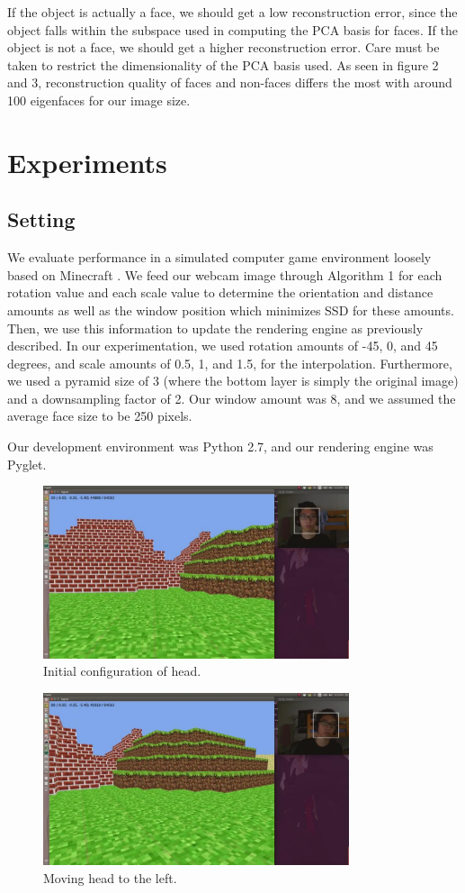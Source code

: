 \documentclass[10pt,twocolumn,letterpaper]{article}
\begin{document}
If the object is actually a face, we should get a low reconstruction error, since the object falls within the subspace used in computing the PCA basis for faces. If the object is not a face, we should get a higher reconstruction error. Care must be taken to restrict the dimensionality of the PCA basis used. As seen in figure 2 and 3, reconstruction quality of faces and non-faces differs the most with around 100 eigenfaces for our image size.

\section*{Experiments}

\subsection*{Setting}
We evaluate performance in a simulated computer game environment loosely based
on Minecraft \cite{minecraft}. We feed our webcam image through Algorithm 1 for each rotation
value and each scale value to determine the orientation and distance amounts as well as
the window position which minimizes SSD for these amounts. Then, we use this
information to update the rendering engine as previously described. In our experimentation,
we used rotation amounts of -45, 0, and 45 degrees, and scale amounts of 0.5, 1, and 1.5,
for the interpolation. Furthermore, we used a pyramid size of 3 (where the bottom
layer is simply the original image) and a downsampling factor of 2. Our window amount
was 8, and we assumed the average face size to be 250 pixels.

Our development environment was Python 2.7, and our rendering engine was Pyglet.
\begin{figure}[ht!]
\centering
\includegraphics[width=90mm]{left_trans.jpg}
\caption{Initial configuration of head.\label{overflow}}
\end{figure}

\begin{figure}[ht!]
\centering
\includegraphics[width=90mm]{right_trans.jpg}
\caption{Moving head to the left.\label{overflow}}
\end{figure}
\end{document}
